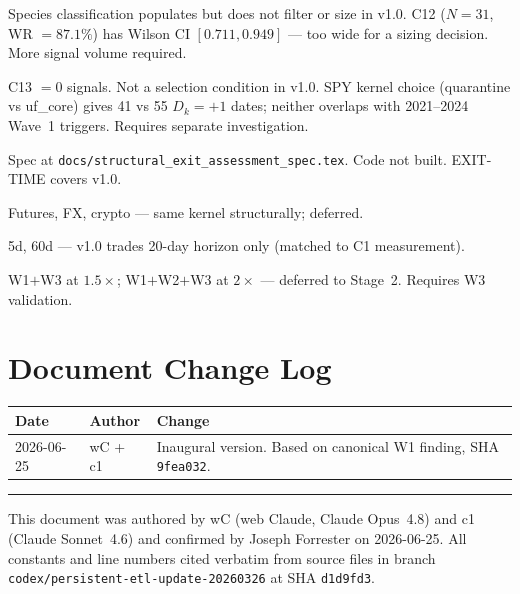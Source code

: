 \documentclass[11pt,a4paper]{article}
\newcommand{\sha}[1]{\texttt{\footnotesize#1}}
\begin{document}
\begin{description}[leftmargin=2.5cm, style=nextline]
  \item[\textbf{Wave 2}] Species classification populates but does not filter or size in v1.0. C12 ($N=31$, WR $= 87.1\%$) has Wilson CI $[0.711, 0.949]$ — too wide for a sizing decision. More signal volume required.
  \item[\textbf{Wave 3}] C13 $= 0$ signals. Not a selection condition in v1.0. SPY kernel choice (quarantine vs uf\_core) gives 41 vs 55 $D_k{=}+1$ dates; neither overlaps with 2021--2024 Wave~1 triggers. Requires separate investigation.
  \item[\textbf{Structural exit}] Spec at \texttt{docs/structural\_exit\_assessment\_spec.tex}. Code not built. EXIT-TIME covers v1.0.
  \item[\textbf{Multi-asset}] Futures, FX, crypto — same kernel structurally; deferred.
  \item[\textbf{Multi-horizon}] 5d, 60d — v1.0 trades 20-day horizon only (matched to C1 measurement).
  \item[\textbf{Conviction sizing}] W1$+$W3 at $1.5\times$; W1$+$W2$+$W3 at $2\times$ — deferred to Stage~2. Requires W3 validation.
\end{description}

\section{Document Change Log}

\begin{center}
\begin{tabular}{lll}
\toprule
\textbf{Date} & \textbf{Author} & \textbf{Change}\\
\midrule
2026-06-25 & wC + c1 & Inaugural version. Based on canonical W1 finding, SHA \sha{9fea032}.\\
\bottomrule
\end{tabular}
\end{center}

\vspace{2cm}
\hrule
\vspace{0.3cm}
{\small\color{tfegray}
This document was authored by wC (web Claude, Claude Opus~4.8) and c1 (Claude Sonnet~4.6) and confirmed by Joseph Forrester on 2026-06-25.
All constants and line numbers cited verbatim from source files in branch \texttt{codex/persistent-etl-update-20260326} at SHA \sha{d1d9fd3}.
}
\end{document}

